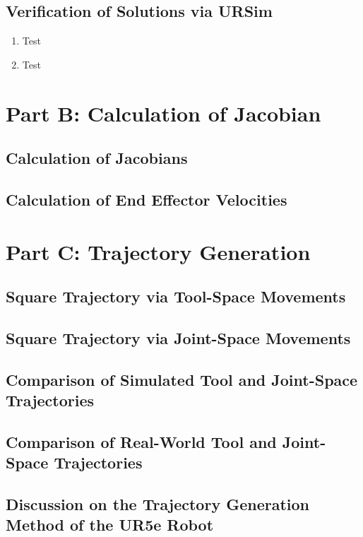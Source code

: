 \documentclass[fleqn]{article}
\begin{document}
\subsection{Verification of Solutions via URSim}

\begin{enumerate}
    \item Test
    \item Test
\end{enumerate}

\section{Part B: Calculation of Jacobian}
\subsection{Calculation of Jacobians}

\subsection{Calculation of End Effector Velocities}

\section{Part C: Trajectory Generation}
\subsection{Square Trajectory via Tool-Space Movements}

\subsection{Square Trajectory via Joint-Space Movements}

\subsection{Comparison of Simulated Tool and Joint-Space Trajectories}

\subsection{Comparison of Real-World Tool and Joint-Space Trajectories}

\subsection{Discussion on the Trajectory Generation Method of the UR5e Robot}
\end{document}
